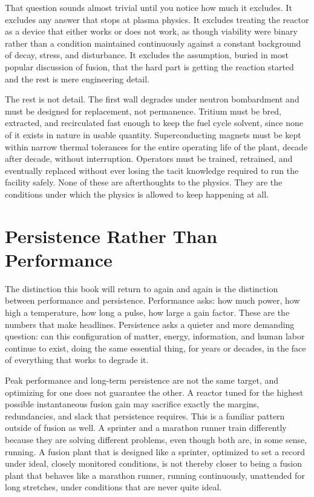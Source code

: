 That question sounds almost trivial until you notice how much it excludes. It excludes any answer that stops at plasma physics. It excludes treating the reactor as a device that either works or does not work, as though viability were binary rather than a condition maintained continuously against a constant background of decay, stress, and disturbance. It excludes the assumption, buried in most popular discussion of fusion, that the hard part is getting the reaction started and the rest is mere engineering detail.

The rest is not detail. The first wall degrades under neutron bombardment and must be designed for replacement, not permanence. Tritium must be bred, extracted, and recirculated fast enough to keep the fuel cycle solvent, since none of it exists in nature in usable quantity. Superconducting magnets must be kept within narrow thermal tolerances for the entire operating life of the plant, decade after decade, without interruption. Operators must be trained, retrained, and eventually replaced without ever losing the tacit knowledge required to run the facility safely. None of these are afterthoughts to the physics. They are the conditions under which the physics is allowed to keep happening at all.

\section{Persistence Rather Than Performance}

The distinction this book will return to again and again is the distinction between performance and persistence. Performance asks: how much power, how high a temperature, how long a pulse, how large a gain factor. These are the numbers that make headlines. Persistence asks a quieter and more demanding question: can this configuration of matter, energy, information, and human labor continue to exist, doing the same essential thing, for years or decades, in the face of everything that works to degrade it.

Peak performance and long-term persistence are not the same target, and optimizing for one does not guarantee the other. A reactor tuned for the highest possible instantaneous fusion gain may sacrifice exactly the margins, redundancies, and slack that persistence requires. This is a familiar pattern outside of fusion as well. A sprinter and a marathon runner train differently because they are solving different problems, even though both are, in some sense, running. A fusion plant that is designed like a sprinter, optimized to set a record under ideal, closely monitored conditions, is not thereby closer to being a fusion plant that behaves like a marathon runner, running continuously, unattended for long stretches, under conditions that are never quite ideal.


